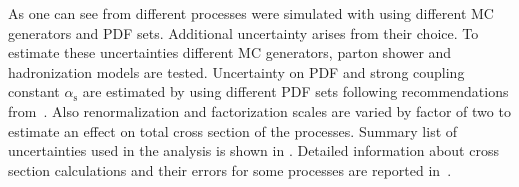 As one can see from  different processes were simulated with using different MC generators and PDF sets.
Additional uncertainty arises from  their choice.
To estimate these uncertainties different MC generators, parton shower and hadronization models are tested.
Uncertainty on PDF and strong coupling constant $\alpha_{\mathrm{s}}$ are estimated by using different PDF sets following recommendations from~\cite{pdf4lhc}.
Also renormalization and factorization scales are varied by factor of two to estimate an effect on total cross section of the processes.
Summary list of uncertainties used in the analysis is shown in .
Detailed information about cross section calculations and their errors for some processes 
are reported in~\cite{diboson_cross_section,ttW_cross_section,ttV_cross_section}.





